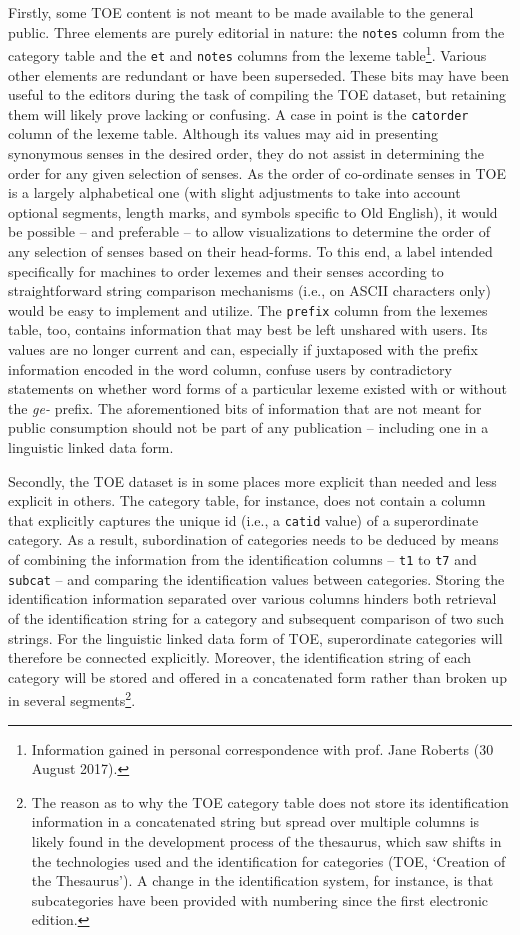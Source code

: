 Firstly, some TOE content is not meant to be made available to the general public. Three elements are purely editorial in nature: the \texttt{notes} column from the category table and the  \texttt{et} and  \texttt{notes} columns from the lexeme table\footnote{Information gained in personal correspondence with prof. Jane Roberts (30 August 2017).}. Various other elements are redundant or have been superseded. These bits may have been useful to the editors during the task of compiling the TOE dataset, but retaining them will likely prove lacking or confusing. A case in point is the  \texttt{catorder} column of the lexeme table. Although its values may aid in presenting synonymous senses in the desired order, they do not assist in determining the order for any given selection of senses. As the order of co-ordinate senses in TOE is a largely alphabetical one (with slight adjustments to take into account optional segments, length marks, and symbols specific to Old English), it would be possible – and preferable – to allow visualizations to determine the order of any selection of senses based on their head-forms. To this end, a label intended specifically for machines to order lexemes and their senses according to straightforward string comparison mechanisms (i.e., on ASCII characters only) would be easy to implement and utilize. The  \texttt{prefix} column from the lexemes table, too, contains information that may best be left unshared with users. Its values are no longer current and can, especially if juxtaposed with the prefix information encoded in the word column, confuse users by contradictory statements on whether word forms of a particular lexeme existed with or without the \textit{ge-} prefix. The aforementioned bits of information that are not meant for public consumption should not be part of any publication – including one in a linguistic linked data form.

Secondly, the TOE dataset is in some places more explicit than needed and less explicit in others. The category table, for instance, does not contain a column that explicitly captures the unique id (i.e., a  \texttt{catid} value) of a superordinate category. As a result, subordination of categories needs to be deduced by means of combining the information from the identification columns –  \texttt{t1} to  \texttt{t7} and  \texttt{subcat} – and comparing the identification values between categories. Storing the identification information separated over various columns hinders both retrieval of the identification string for a category and subsequent comparison of two such strings. For the linguistic linked data form of TOE, superordinate categories will therefore be connected explicitly. Moreover, the identification string of each category will be stored and offered in a concatenated form rather than broken up in several segments\footnote{The reason as to why the TOE category table does not store its identification information in a concatenated string but spread over multiple columns is likely found in the development process of the thesaurus, which saw shifts in the technologies used and the identification for categories (TOE, ‘Creation of the Thesaurus’). A change in the identification system, for instance, is that subcategories have been provided with numbering since the first electronic edition.}.

